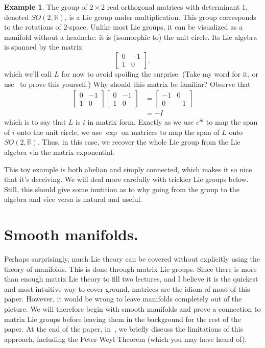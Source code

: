 \documentclass[12pt]{article}
\newcommand{\R}{\mathbb{R}}
\theoremstyle{definition}
\theoremstyle{definition}
\theoremstyle{definition}
\theoremstyle{definition}
\theoremstyle{definition}
\theoremstyle{definition}
\newtheorem{ex}[them]{Example}
\theoremstyle{definition}
\theoremstyle{definition}
\begin{document}
\begin{ex}
The group of $2 \times 2$ real
orthogonal matrices with determinant $1$, denoted
$SO(2, \R)$, is a Lie group under multiplication.
This group corresponds to the rotations of
$2$-space. Unlike most Lie groups, it can be
visualized as a manifold without a headache: it is
(isomorphic to) the unit circle. Its Lie algebra
is spanned by the matrix 
\[
\begin{bmatrix}
    0 & -1 \\
    1 & 0 
\end{bmatrix},
\] 
which we’ll call $L$ for now to avoid spoiling the
surprise. (Take my word for it, or
use~ to prove this yourself.) Why
should this matrix be familiar? Observe that
\[
\begin{aligned}
    \begin{bmatrix} 
        0 & -1 \\
        1 & 0 
    \end{bmatrix}
    \begin{bmatrix}
        0 & -1 \\
        1 & 0 
    \end{bmatrix} 
    & = 
    \begin{bmatrix} 
        -1 & 0 \\
        0 & -1
    \end{bmatrix} \\
    & = -I
\end{aligned}
\] 
which is to say that $L$ is $i$ in matrix form.
Exactly as we use $e^{i\theta}$ to map the span of
$i$ onto the unit circle, we use $\exp$ on
matrices to map the span of $L$ onto $SO(2,
\R)$. Thus, in this case, we recover the whole Lie
group from the Lie algebra via the matrix
exponential.
\end{ex}

\par{This toy example is both abelian and simply
connected, which makes it so nice that it’s
deceiving. We will deal more carefully with
trickier Lie groups below. Still, this should give
some inutition as to why going from the group to
the algebra and vice versa is natural and
useful.}

\section{Smooth manifolds.}

\par{Perhaps surprisingly, much Lie theory can be
covered without explicitly using the theory of
manifolds. This is done through matrix Lie groups.
Since there is more than enough matrix Lie
theory to fill two lectures, and I believe it is
the quickest and most intuitive way to cover
ground, matrices are the idiom of most of this
paper. However, it would be wrong to leave
manifolds completely out of the picture. We will
therefore begin with smooth manifolds and prove a
connection to matrix Lie groups before leaving
them in the background for the rest of the paper.
At the end of the paper, in~, we
briefly discuss the limitations of this approach,
including the Peter-Weyl Theorem (which you may have
heard of).}
\end{document}
